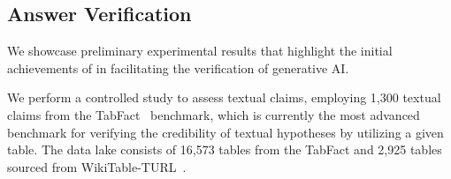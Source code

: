

\subsection{Answer Verification}

We showcase preliminary experimental results that highlight the initial achievements of \sys in facilitating the verification of generative AI. 

We perform a controlled study to assess textual claims, employing 1,300 textual claims from the TabFact~\cite{chen2019tabfact} benchmark, which is currently the most advanced benchmark for verifying the credibility of textual hypotheses by utilizing a given table. The data lake consists of 16,573 tables from the TabFact and 2,925 tables sourced from WikiTable-TURL~\cite{deng2022turl}.


